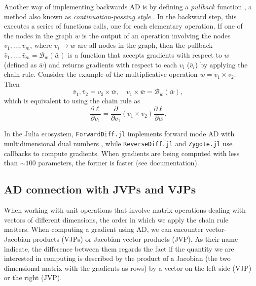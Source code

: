 Another way of implementing backwards AD is by defining a \textit{pullback} function \cite{Innes_2018}, a method also known as \textit{continuation-passing style} \cite{Wang_Zheng_Decker_Wu_Essertel_Rompf_2019}. In the backward step, this executes a series of functions calls, one for each elementary operation.
If one of the nodes in the graph $w$ is the output of an operation involving the nodes $v_1, \ldots, v_m$, where $v_i \rightarrow w$ are all nodes in the graph, then the pullback $\bar v_1, \ldots, \bar v_m = \mathcal B_w(\bar w)$ is a function that accepts gradients with respect to $w$ (defined as $\bar w$) and returns gradients with respect to each $v_i$ ($\bar v_i$) by applying the chain rule. Consider the example of the multiplicative operation $w = v_1 \times v_2$. Then
\begin{equation}
 \bar v_1, \bar v_2 = v_2 \times \bar w , \quad
 v_1 \times \bar w = \mathcal{B}_w (\bar w),
\end{equation}
which is equivalent to using the chain rule as 
\begin{equation}
 \frac{\partial \ell}{\partial v_1} = \frac{\partial}{\partial v_1}(v_1 \times v_2) \frac{\partial \ell}{\partial w}.
\end{equation}

In the Julia ecosystem, \texttt{ForwardDiff.jl} implements forward mode AD with multidimensional dual numbers \cite{RevelsLubinPapamarkou2016},
while \texttt{ReverseDiff.jl} and \texttt{Zygote.jl} use callbacks to compute gradients. When gradients are being computed with less than $\sim 100$ parameters, the former is faster (see documentation).

\subsection{AD connection with JVPs and VJPs}

When working with unit operations that involve matrix operations dealing with vectors of different dimensions, the order in which we apply the chain rule matters. When computing a gradient using AD, we can encounter vector-Jacobian products (VJPs) or Jacobian-vector products (JVP). As their name indicate, the difference between them regards the fact if the quantity we are interested in computing is described by the product of a Jacobian (the two dimensional matrix with the gradients as rows) by a vector on the left
side (VJP) or the right (JVP).

